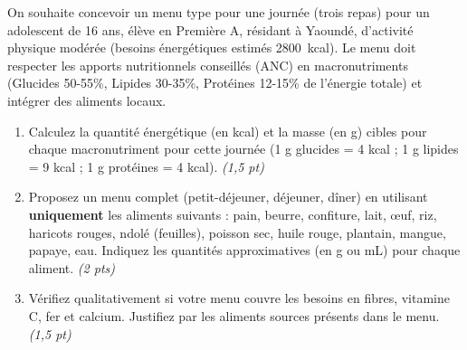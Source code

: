 \documentclass[11pt]{article}
\begin{document}
\begin{exercice}
On souhaite concevoir un menu type pour une journée (trois repas) pour un adolescent de 16 ans, élève en Première A, résidant à Yaoundé, d'activité physique modérée (besoins énergétiques estimés \approx \SI{2800}{kcal}). Le menu doit respecter les apports nutritionnels conseillés (ANC) en macronutriments (Glucides 50-55\%, Lipides 30-35\%, Protéines 12-15\% de l'énergie totale) et intégrer des aliments locaux.

\begin{enumerate}
    \item Calculez la quantité énergétique (en kcal) et la masse (en g) cibles pour chaque macronutriment pour cette journée (1 g glucides = 4 kcal ; 1 g lipides = 9 kcal ; 1 g protéines = 4 kcal). \textit{(1,5 pt)}
    \item Proposez un menu complet (petit-déjeuner, déjeuner, dîner) en utilisant \textbf{uniquement} les aliments suivants : pain, beurre, confiture, lait, œuf, riz, haricots rouges, ndolé (feuilles), poisson sec, huile rouge, plantain, mangue, papaye, eau. Indiquez les quantités approximatives (en g ou mL) pour chaque aliment. \textit{(2 pts)}
    \item Vérifiez qualitativement si votre menu couvre les besoins en fibres, vitamine C, fer et calcium. Justifiez par les aliments sources présents dans le menu. \textit{(1,5 pt)}
\end{enumerate}
\end{exercice}
\end{document}
